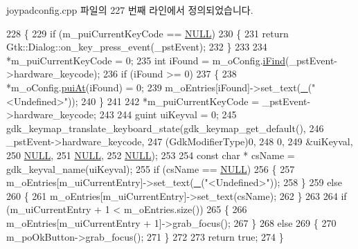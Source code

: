 joypadconfig.\+cpp 파일의 227 번째 라인에서 정의되었습니다.


\begin{DoxyCode}
228 \{
229   \textcolor{keywordflow}{if} (m\_puiCurrentKeyCode == \mbox{\hyperlink{getopt1_8c_a070d2ce7b6bb7e5c05602aa8c308d0c4}{NULL}})
230   \{
231     \textcolor{keywordflow}{return} Gtk::Dialog::on\_key\_press\_event(\_pstEvent);
232   \}
233 
234   *m\_puiCurrentKeyCode = 0;
235   \textcolor{keywordtype}{int} iFound = m\_oConfig.\mbox{\hyperlink{class_v_b_a_1_1_joypad_config_a27d56b77293ce938b1a6437a384d625d}{iFind}}(\_pstEvent->hardware\_keycode);
236   \textcolor{keywordflow}{if} (iFound >= 0)
237   \{
238     *m\_oConfig.\mbox{\hyperlink{class_v_b_a_1_1_joypad_config_afa304227fa214176c874619365ffc445}{puiAt}}(iFound) = 0;
239     m\_oEntries[iFound]->set\_text(\mbox{\hyperlink{getopt_8c_a86a239addea586602343007a370bf8ad}{\_}}(\textcolor{stringliteral}{"<Undefined>"}));
240   \}
241 
242   *m\_puiCurrentKeyCode = \_pstEvent->hardware\_keycode;
243 
244   guint uiKeyval = 0;
245   gdk\_keymap\_translate\_keyboard\_state(gdk\_keymap\_get\_default(),
246                                       \_pstEvent->hardware\_keycode,
247                                       (GdkModifierType)0,
248                                       0,
249                                       &uiKeyval,
250                                       \mbox{\hyperlink{getopt1_8c_a070d2ce7b6bb7e5c05602aa8c308d0c4}{NULL}},
251                                       \mbox{\hyperlink{getopt1_8c_a070d2ce7b6bb7e5c05602aa8c308d0c4}{NULL}},
252                                       \mbox{\hyperlink{getopt1_8c_a070d2ce7b6bb7e5c05602aa8c308d0c4}{NULL}});
253 
254   \textcolor{keyword}{const} \textcolor{keywordtype}{char} * csName = gdk\_keyval\_name(uiKeyval);
255   \textcolor{keywordflow}{if} (csName == \mbox{\hyperlink{getopt1_8c_a070d2ce7b6bb7e5c05602aa8c308d0c4}{NULL}})
256   \{
257     m\_oEntries[m\_uiCurrentEntry]->set\_text(\mbox{\hyperlink{getopt_8c_a86a239addea586602343007a370bf8ad}{\_}}(\textcolor{stringliteral}{"<Undefined>"}));
258   \}
259   \textcolor{keywordflow}{else}
260   \{
261     m\_oEntries[m\_uiCurrentEntry]->set\_text(csName);
262   \}
263 
264   \textcolor{keywordflow}{if} (m\_uiCurrentEntry + 1 < m\_oEntries.size())
265   \{
266     m\_oEntries[m\_uiCurrentEntry + 1]->grab\_focus();
267   \}
268   \textcolor{keywordflow}{else}
269   \{
270     m\_poOkButton->grab\_focus();
271   \}
272 
273   \textcolor{keywordflow}{return} \textcolor{keyword}{true};
274 \}
\end{DoxyCode}

